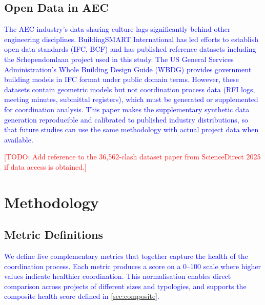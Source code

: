 \documentclass[conference]{IEEEtran}
\newcommand{\todo}[1]{\textcolor{red}{[TODO: #1]}}
\newcommand{\placeholder}[1]{\textcolor{blue}{#1}}
\begin{document}
\subsection{Open Data in AEC}
\placeholder{
The AEC industry's data sharing culture lags significantly behind other engineering disciplines. BuildingSMART International has led efforts to establish open data standards (IFC, BCF) and has published reference datasets including the Schependomlaan project used in this study. The US General Services Administration's Whole Building Design Guide (WBDG) provides government building models in IFC format under public domain terms. However, these datasets contain geometric models but not coordination process data (RFI logs, meeting minutes, submittal registers), which must be generated or supplemented for coordination analysis. This paper makes the supplementary synthetic data generation reproducible and calibrated to published industry distributions, so that future studies can use the same methodology with actual project data when available.

\todo{Add reference to the 36,562-clash dataset paper from ScienceDirect 2025 if data access is obtained.}
}

\section{Methodology}

\subsection{Metric Definitions}

\placeholder{
We define five complementary metrics that together capture the health of the coordination process. Each metric produces a score on a 0--100 scale where higher values indicate healthier coordination. This normalisation enables direct comparison across projects of different sizes and typologies, and supports the composite health score defined in \cref{sec:composite}.
}
\end{document}
